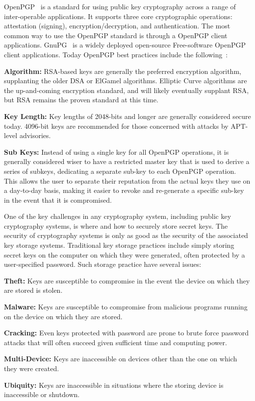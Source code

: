 \documentclass[11pt, twocolumn]{article}
\newenvironment{packed_desc}{
\begin{description}
  \setlength{\itemsep}{1pt}
  \setlength{\parskip}{0pt}
  \setlength{\parsep}{0pt}
}{\end{description}}
\begin{document}
OpenPGP~\cite{openpgp, rfc4880} is a standard for using public key
cryptography across a range of inter-operable applications. It
supports three core cryptographic operations: attestation (signing),
encryption/decryption, and authentication. The most common way to use
the OpenPGP standard is through a OpenPGP client
applications. GnuPG~\cite{gnupg} is a widely deployed open-source
Free-software OpenPGP client applications. Today OpenPGP best
practices include the following~\cite{matt-openpgp}:

\begin{packed_desc}
\item{\textbf{Algorithm:}} RSA-based keys are generally the preferred
  encryption algorithm, supplanting the older DSA or ElGamel
  algorithms. Elliptic Curve algorithms are the up-and-coming
  encryption standard, and will likely eventually supplant RSA, but
  RSA remains the proven standard at this time.
\item{\textbf{Key Length:}} Key lengths of 2048-bits and longer are
  generally considered secure today. 4096-bit keys are recommended for
  those concerned with attacks by APT-level advisories.
\item{\textbf{Sub Keys:}} Instead of using a single key for all
  OpenPGP operations, it is generally considered wiser to have a
  restricted master key that is used to derive a series of subkeys,
  dedicating a separate sub-key to each OpenPGP operation. This allows
  the user to separate their reputation from the actual keys they use
  on a day-to-day basis, making it easier to revoke and re-generate a
  specific sub-key in the event that it is compromised.
\end{packed_desc}

One of the key challenges in any cryptography system, including public
key cryptography systems, is where and how to securely store secret
keys. The security of cryptography systems is only as good as the
security of the associated key storage systems. Traditional key
storage practices include simply storing secret keys on the computer
on which they were generated, often protected by a user-specified
password. Such storage practice have several issues:

\begin{packed_desc}
\item{\textbf{Theft:}} Keys are susceptible to compromise in the event
  the device on which they are stored is stolen.
\item{\textbf{Malware:}} Keys are susceptible to compromise from
  malicious programs running on the device on which they are stored.
\item{\textbf{Cracking:}} Even keys protected with password are prone
  to brute force password attacks that will often succeed given
  sufficient time and computing power.
\item{\textbf{Multi-Device:}} Keys are inaccessible on devices other
  than the one on which they were created.
\item{\textbf{Ubiquity:}} Keys are inaccessible in situations where
  the storing device is inaccessible or shutdown.
\end{packed_desc}
\end{document}
